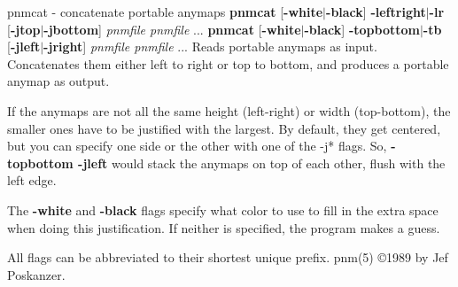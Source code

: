 pnmcat - concatenate portable anymaps
{\bf pnmcat}
{\rm [}{\bf -white}{\rm $|$}{\bf -black}{\rm ]}
{\bf -leftright}{\rm $|$}{\bf -lr}
{\rm [}{\bf -jtop}{\rm $|$}{\bf -jbottom}{\rm ]}
{\it pnmfile pnmfile}
{\rm ...}
\nwl
{\bf pnmcat}
{\rm [}{\bf -white}{\rm $|$}{\bf -black}{\rm ]}
{\bf -topbottom}{\rm $|$}{\bf -tb}
{\rm [}{\bf -jleft}{\rm $|$}{\bf -jright}{\rm ]}
{\it pnmfile pnmfile}
{\rm ...}
Reads portable anymaps as input.
Concatenates them either left to right or top to bottom, and produces a
portable anymap as output.
\par
If the anymaps are not all the same height (left-right) or width (top-bottom),
the smaller ones have to be justified with the largest.
By default, they get centered, but you can specify one side or the other
with one of the -j* flags.
So,
{\bf -topbottom -jleft}
would stack the anymaps on top of each other, flush with the left edge.
\par
The
{\bf -white}
and
{\bf -black}
flags specify what color to use to fill in the extra space
when doing this justification.
If neither is specified, the program makes a guess.
\par
All flags can be abbreviated to their shortest unique prefix.
pnm(5)
\copyright 1989 by Jef Poskanzer.
%
 
%

\newpage
%


